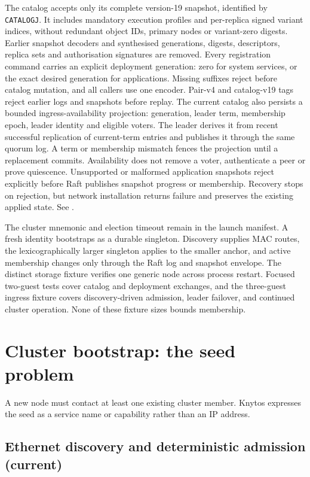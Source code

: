 The catalog accepts only its complete version-19 snapshot, identified by
\texttt{CATALOGJ}. It includes mandatory execution profiles and per-replica signed variant indices,
without redundant object IDs, primary nodes or variant-zero digests. Earlier snapshot decoders and synthesised generations,
digests, descriptors, replica sets and authorisation signatures are removed.
Every registration command carries an explicit deployment generation: zero
for system services, or the exact desired generation for applications. Missing
suffixes reject before catalog mutation, and all callers use one encoder. Pair-v4
and catalog-v19 tags reject earlier logs and snapshots before replay.
The current catalog also persists a bounded ingress-availability projection:
generation, leader term, membership epoch, leader identity and eligible voters.
The leader derives it from recent successful replication of current-term
entries and publishes it through the same quorum log. A term or membership
mismatch fences the projection until a replacement commits. Availability
does not remove a voter, authenticate a peer or prove quiescence.
Unsupported or malformed application snapshots reject explicitly before Raft
publishes snapshot progress or membership. Recovery stops on rejection, but
network installation returns failure and preserves the existing applied state.
See .

The cluster mnemonic and election timeout remain in the launch manifest. A
fresh identity bootstraps as a durable singleton. Discovery supplies MAC routes,
the lexicographically larger singleton applies to the smaller anchor, and
active membership changes only through the Raft log and snapshot envelope.
The distinct storage fixture verifies one generic node across process restart.
Focused two-guest tests cover catalog and deployment exchanges, and the
three-guest ingress fixture covers discovery-driven admission, leader failover,
and continued cluster operation. None of these fixture sizes bounds membership.

\section{Cluster bootstrap: the seed problem}

A new node must contact at least one existing cluster member. Knytos
expresses the seed as a service name or capability rather than an IP address.

\subsection{Ethernet discovery and deterministic admission (current)}

